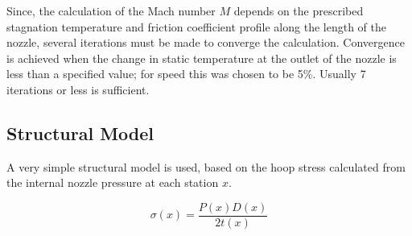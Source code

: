 \documentclass{article}
\begin{document}
Since, the calculation of the Mach number $M$ depends on the prescribed stagnation temperature and friction coefficient profile along the length of the nozzle, several iterations must be made to converge the calculation. Convergence is achieved when the change in static temperature at the outlet of the nozzle is less than a specified value; for speed this was chosen to be 5\%. Usually 7 iterations or less is sufficient.

\subsection{Structural Model}

A very simple structural model is used, based on the hoop stress calculated from the internal nozzle pressure at each station $x$. 

\begin{equation}
\sigma (x) = \frac{P(x) D(x)}{2 t(x)}
\end{equation}



\end{document}
